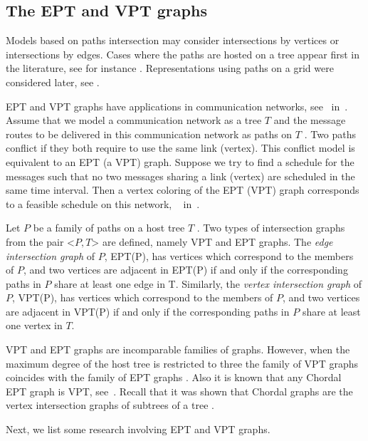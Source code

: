 \subsection{The EPT and VPT graphs}

Models based on paths intersection  may consider  intersections by vertices or   intersections by edges.  Cases where the paths are hosted on a tree  appear first in the literature, see for instance \cite{gavril1978recognition, golumbic1985edge, golumbic1985}.  Representations using paths on a grid were considered later, see  \cite{golumbic2009,golumbic2013, golumbic2013intersection}.

EPT and VPT graphs have applications in communication networks, see~\cite{boyaci2013graphs} in~\cite{brandstadt2013graph}. Assume
that we model a communication network as a tree $T$ and the message routes to be delivered in this communication network as paths on $T$ . Two paths conflict if they both require to use the same link (vertex). This conflict model is equivalent to an EPT (a VPT) graph. Suppose we try to find a schedule for the messages such that no two messages sharing a link (vertex) are scheduled in the same time interval. Then a vertex coloring of the EPT (VPT) graph corresponds to a feasible schedule on this network, ~\cite{boyaci2013graphs} in~\cite{brandstadt2013graph}.

 Let $P$ be a family of paths on a host tree $T$ . Two types of intersection graphs from the pair <$P,T$> are defined, namely VPT and EPT graphs.
The \textit{edge intersection graph} of $P$, EPT(P), has vertices which correspond to the members of $P$, and two vertices are adjacent in EPT(P) if and only if the corresponding paths in $P$ share at least one edge in T. Similarly, the \textit{vertex intersection graph} of $P$, VPT(P), has vertices which correspond to the members of $P$, and two vertices are adjacent in VPT(P) if and only if the corresponding paths in $P$ share at least one vertex in $T$.

VPT and EPT graphs are incomparable families of graphs. However, when the maximum degree of the host tree is restricted to three the family of
VPT graphs coincides with the family of EPT graphs \cite{golumbic1985edge}. Also it is known that any Chordal EPT graph is VPT, see~\cite{syslo1985triangulated}. Recall that it was shown that Chordal graphs are the vertex intersection graphs of subtrees of a tree \cite{gavril1974intersection}.

Next, we list some research involving EPT and VPT graphs.

